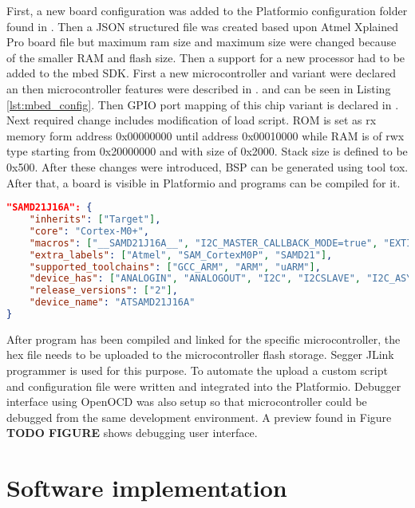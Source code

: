 First, a new board configuration was added to the Platformio configuration folder found in . Then a \ac{JSON} structured file was created based upon Atmel Xplained Pro board file but maximum ram size and maximum size were changed because of the smaller \ac{RAM} and flash size. Then a support for a new processor had to be added to the mbed \ac{SDK}. First a new microcontroller and variant were declared an then microcontroller features were described in . and can be seen in Listing \ref{lst:mbed_config}. Then \ac{GPIO} port mapping of this chip variant is declared in . Next required change includes modification of load script. \ac{ROM} is set as rx memory form address 0x00000000 until address 0x00010000 while \ac{RAM} is of rwx type starting from 0x20000000 and with size of 0x2000. Stack size is defined to be 0x500. After these changes were introduced, \ac{BSP} can be generated using tool tox. After that, a board is visible in Platformio and programs can be compiled for it.

\begin{lstlisting}[language=json,firstnumber=1,caption={Description of mbed features implemented in ATSAMD21J16},label={lst:mbed_config}]
"SAMD21J16A": {
    "inherits": ["Target"],
    "core": "Cortex-M0+",
    "macros": ["__SAMD21J16A__", "I2C_MASTER_CALLBACK_MODE=true", "EXTINT_CALLBACK_MODE=true", "USART_CALLBACK_MODE=true", "TC_ASYNC=true"],
    "extra_labels": ["Atmel", "SAM_CortexM0P", "SAMD21"],
    "supported_toolchains": ["GCC_ARM", "ARM", "uARM"],
    "device_has": ["ANALOGIN", "ANALOGOUT", "I2C", "I2CSLAVE", "I2C_ASYNCH", "INTERRUPTIN", "PORTIN", "PORTINOUT", "PORTOUT", "PWMOUT", "RTC", "SERIAL", "SERIAL_ASYNCH", "SERIAL_FC", "SLEEP", "SPI", "SPISLAVE", "SPI_ASYNCH"],
    "release_versions": ["2"],
    "device_name": "ATSAMD21J16A"
}
\end{lstlisting}

After program has been compiled and linked for the specific microcontroller, the hex file needs to be uploaded to the microcontroller flash storage. Segger JLink programmer is used for this purpose. To automate the upload a custom script and configuration file were written and integrated into the Platformio. Debugger interface using OpenOCD was also setup so that microcontroller could be debugged from the same development environment. A preview found in Figure \textbf{TODO FIGURE} shows debugging user interface. 


\section{Software implementation}

